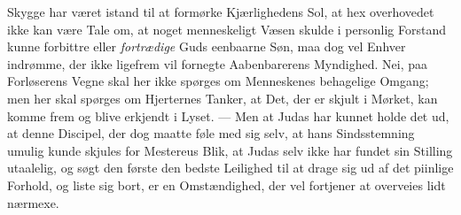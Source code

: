 \documentclass[12pt,a4paper]{book}
\begin{document}
Skygge har været istand til at formørke Kjærlighedens Sol, at hex
overhovedet ikke kan være Tale om, at noget menneskeligt Væsen skulde i personlig Forstand
kunne forbittre eller \emph{fortrædige} Guds eenbaarne Søn, maa dog vel Enhver indrømme, der
ikke ligefrem vil fornegte Aabenbarerens Myndighed. Nei, paa Forløserens Vegne skal her ikke
spørges om Menneskenes behagelige Omgang; men her skal spørges om Hjerternes Tanker, at Det,
der er skjult i Mørket, kan komme frem og blive erkjendt i Lyset. --- Men at Judas har
kunnet holde det ud, at denne Discipel, der dog maatte føle med sig selv, at hans
Sindsstemning umulig kunde skjules for Mestereus Blik, at Judas selv ikke har fundet sin
Stilling utaalelig, og søgt den første den bedste Leilighed til at drage sig ud af det
piinlige Forhold, og liste sig bort, er en Omstændighed, der vel fortjener at overveies lidt
nærmexe.
\end{document}

